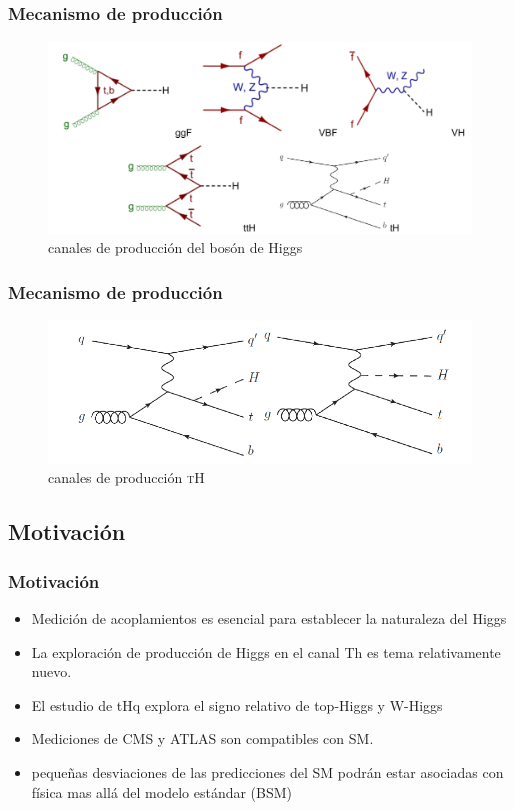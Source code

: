 \documentclass[11pt]{beamer}
\begin{document}
\begin{frame}
\frametitle{Mecanismo de producci\'on}
\begin{center}
	\begin{figure}
		\includegraphics[width=\linewidth]{pg.png}
		\caption{canales de producci\'on del bos\'on de Higgs}
	\end{figure}
\end{center}
\end{frame}



\begin{frame}
\frametitle{Mecanismo de producci\'on}
\begin{center}
	\begin{figure}
		\includegraphics[width=\linewidth]{tq.png}
		\caption{canales de producci\'on \textsc{tH}}
	\end{figure}
\end{center}	
\end{frame}

\begin{frame}
\section{Motivaci\'on}
\frametitle{Motivaci\'on}

\begin{itemize}
	\item Medici\'on de acoplamientos es esencial para establecer la naturaleza del Higgs
	\item La exploraci\'on de producci\'on de Higgs en el canal Th es tema relativamente nuevo. 
	\item El estudio de tHq explora el signo relativo de  top-Higgs y W-Higgs
	\item Mediciones de CMS y ATLAS son compatibles con SM.
	\item peque\~nas desviaciones de las predicciones del SM podr\'an estar asociadas con f\'isica mas all\'a del modelo est\'andar (BSM)
\end{itemize}
\end{frame}
\end{document}

